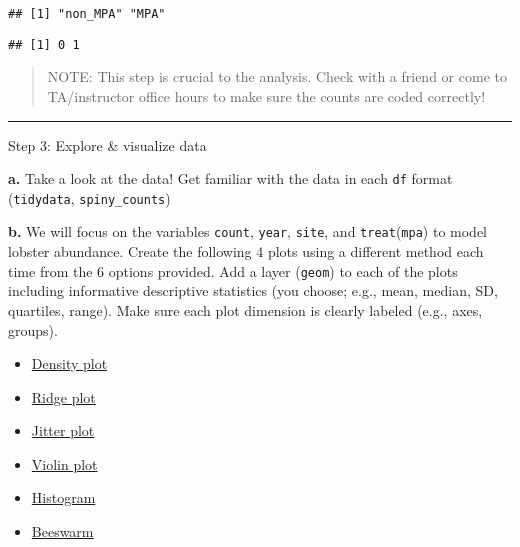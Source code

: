 \documentclass[
]{article}
\newenvironment{Shaded}{\begin{snugshade}}{\end{snugshade}}
\newcommand{\FunctionTok}[1]{\textcolor[rgb]{0.13,0.29,0.53}{\textbf{#1}}}
\newcommand{\NormalTok}[1]{#1}
\newcommand{\SpecialCharTok}[1]{\textcolor[rgb]{0.81,0.36,0.00}{\textbf{#1}}}
\providecommand{\tightlist}{%
  \setlength{\itemsep}{0pt}\setlength{\parskip}{0pt}}
\begin{document}
\begin{verbatim}
## [1] "non_MPA" "MPA"
\end{verbatim}

\begin{Shaded}
\end{Shaded}

\begin{verbatim}
## [1] 0 1
\end{verbatim}

\begin{quote}
NOTE: This step is crucial to the analysis. Check with a friend or come
to TA/instructor office hours to make sure the counts are coded
correctly!
\end{quote}

\begin{center}\rule{0.5\linewidth}{0.5pt}\end{center}

Step 3: Explore \& visualize data

\textbf{a.} Take a look at the data! Get familiar with the data in each
\texttt{df} format (\texttt{tidydata}, \texttt{spiny\_counts})

\textbf{b.} We will focus on the variables \texttt{count},
\texttt{year}, \texttt{site}, and \texttt{treat}(\texttt{mpa}) to model
lobster abundance. Create the following 4 plots using a different method
each time from the 6 options provided. Add a layer (\texttt{geom}) to
each of the plots including informative descriptive statistics (you
choose; e.g., mean, median, SD, quartiles, range). Make sure each plot
dimension is clearly labeled (e.g., axes, groups).

\begin{itemize}
\tightlist
\item
  \href{https://r-charts.com/distribution/density-plot-group-ggplot2}{Density
  plot}
\item
  \href{https://r-charts.com/distribution/ggridges/}{Ridge plot}
\item
  \href{https://ggplot2.tidyverse.org/reference/geom_jitter.html}{Jitter
  plot}
\item
  \href{https://r-charts.com/distribution/violin-plot-group-ggplot2}{Violin
  plot}
\item
  \href{https://r-charts.com/distribution/histogram-density-ggplot2/}{Histogram}
\item
  \href{https://r-charts.com/distribution/beeswarm/}{Beeswarm}
\end{itemize}
\end{document}
